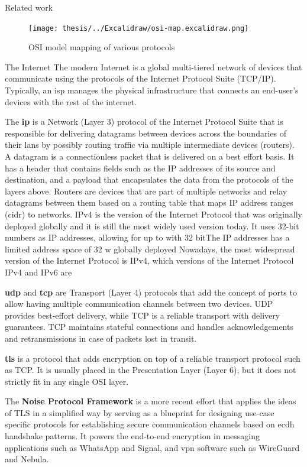 \begin{frame}[fragile]{Related work}
\newpage

\begin{figure}
\centering
\texttt{[image: thesis/../Excalidraw/osi-map.excalidraw.png]}
\caption{OSI model mapping of various protocols \label{osiMap}}
\end{figure}

\begin{block}{The Internet}
\protect\hypertarget{the-internet}{}
The modern Internet is a global multi-tiered network of devices that
communicate using the protocols of the Internet Protocol Suite (TCP/IP).
Typically, an \gls{isp} manages the physical infrastructure that
connects an end-user's devices with the rest of the internet.

The \textbf{\acrfull{ip}} is a Network (Layer 3) protocol of the
Internet Protocol Suite that is responsible for delivering datagrams
between devices across the boundaries of their \glspl{lan} by possibly
routing traffic via multiple intermediate devices (routers). A datagram
is a connectionless packet that is delivered on a best effort basis. It
has a header that contains fields such as the IP addresses of its source
and destination, and a payload that encapsulates the data from the
protocols of the layers above. Routers are devices that are part of
multiple networks and relay datagrams between them based on a routing
table that maps IP address ranges (\gls{cidr}) to networks. IPv4 is the
version of the Internet Protocol that was originally deployed globally
and it is still the most widely used version today. It uses 32-bit
numbers as IP addresses, allowing for up to with 32 bitThe IP addresses
has a limited address space of 32 w globally deployed Nowadays, the most
widespread version of the Internet Protocol is IPv4, which versions of
the Internet Protocol IPv4 and IPv6 are

\textbf{\acrfull{udp}} and \textbf{\acrfull{tcp}} are Transport (Layer
4) protocols that add the concept of ports to allow having multiple
communication channels between two devices. UDP provides best-effort
delivery, while TCP is a reliable transport with delivery guarantees.
TCP maintains stateful connections and handles acknowledgements and
retransmissions in case of packets lost in transit.

\textbf{\acrfull{tls}} is a protocol that adds encryption on top of a
reliable transport protocol such as TCP. It is usually placed in the
Presentation Layer (Layer 6), but it does not strictly fit in any single
OSI layer. 

The \textbf{Noise Protocol Framework} \autocite{noiseDocs} is a more
recent effort that applies the ideas of TLS in a simplified way by
serving as a blueprint for designing use-case specific protocols for
establishing secure communication channels based on \gls{ecdh} handshake
patterns. It powers the end-to-end encryption in messaging applications
such as WhatsApp and Signal, and \gls{vpn} software such as WireGuard
and Nebula.  


\end{block}
\end{frame}

